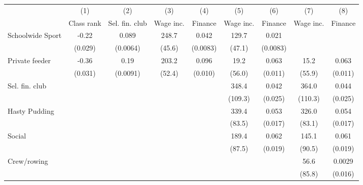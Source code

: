 \begin{tabular}{l*{8}{c}}
\toprule
                    &\multicolumn{1}{c}{(1)}&\multicolumn{1}{c}{(2)}&\multicolumn{1}{c}{(3)}&\multicolumn{1}{c}{(4)}&\multicolumn{1}{c}{(5)}&\multicolumn{1}{c}{(6)}&\multicolumn{1}{c}{(7)}&\multicolumn{1}{c}{(8)}\\
                    &\multicolumn{1}{c}{Class rank}&\multicolumn{1}{c}{Sel. fin. club}&\multicolumn{1}{c}{Wage inc.}&\multicolumn{1}{c}{Finance}&\multicolumn{1}{c}{Wage inc.}&\multicolumn{1}{c}{Finance}&\multicolumn{1}{c}{Wage inc.}&\multicolumn{1}{c}{Finance}\\
\midrule
Schoolwide Sport    &       -0.22&       0.089&       248.7&       0.042&       129.7&       0.021&            &            \\
                    &     (0.029)&    (0.0064)&      (45.6)&    (0.0083)&      (47.1)&    (0.0083)&            &            \\
\addlinespace
Private feeder      &       -0.36&        0.19&       203.2&       0.096&        19.2&       0.063&        15.2&       0.063\\
                    &     (0.031)&    (0.0091)&      (52.4)&     (0.010)&      (56.0)&     (0.011)&      (55.9)&     (0.011)\\
\addlinespace
Sel. fin. club      &            &            &            &            &       348.4&       0.042&       364.0&       0.044\\
                    &            &            &            &            &     (109.3)&     (0.025)&     (110.3)&     (0.025)\\
\addlinespace
Hasty Pudding       &            &            &            &            &       339.4&       0.053&       326.0&       0.054\\
                    &            &            &            &            &      (83.5)&     (0.017)&      (83.1)&     (0.017)\\
\addlinespace
Social              &            &            &            &            &       189.4&       0.062&       145.1&       0.061\\
                    &            &            &            &            &      (87.5)&     (0.019)&      (90.5)&     (0.019)\\
\addlinespace
Crew/rowing         &            &            &            &            &            &            &        56.6&      0.0029\\
                    &            &            &            &            &            &            &      (85.8)&     (0.016)\\

\end{tabular}
